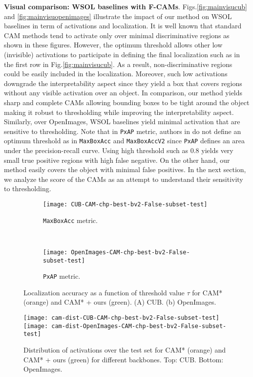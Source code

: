 \documentclass[twocolumn]{article}
\newcommand\maxboxacc{\texttt{MaxBoxAcc}\xspace}
\newcommand\newmaxboxacc{\texttt{MaxBoxAccV2}\xspace}
\newcommand\pxap{\texttt{PxAP}\xspace}
\theoremstyle{definition}
\begin{document}
\noindent \textbf{Visual comparison: WSOL baselines with F-CAMs}. Figs.\ref{fig:mainvisucub} and \ref{fig:mainvisuopenimages} illustrate the impact of our method on WSOL baselines in term of activations and localization. It is well known that standard CAM methods tend to activate only over minimal discriminative regions as shown in these figures. However, the optimum threshold allows other low (invisible) activations to participate in defining the final localization such as in the first row in Fig.\ref{fig:mainvisucub}.  As a result, non-discriminative regions could be easily included in the localization. Moreover, such low activations downgrade the interpretability aspect since they yield a box that covers regions without any visible activation over an object.
In comparison, our method yields sharp and complete CAMs allowing bounding boxes to be tight around the object making it robust to thresholding while improving the interpretability aspect.
Similarly, over OpenImages, WSOL baselines yield minimal activation that are sensitive to thresholding. Note that in \pxap metric, authors in \cite{choe2020evaluating} do not define an optimum threshold as in \maxboxacc and \newmaxboxacc since \pxap defines an area under the precision-recall curve. Using high threshold such as $0.8$ yields very small true positive regions with high false negative. On the other hand, our method easily covers the object with minimal false positives.
In the next section, we analyze the score of the CAMs as an attempt to understand their sensitivity to thresholding.
\begin{figure}
     \centering
     \begin{subfigure}[b]{0.45\textwidth}
         \centering
         \texttt{[image: CUB-CAM-chp-best-bv2-False-subset-test]}
          \caption{\maxboxacc metric.}
         \label{fig:cam-maxbo-tau}
     \end{subfigure}
     \\
     \vspace{.2cm}
     \begin{subfigure}[b]{0.45\textwidth}
         \centering
         \texttt{[image: OpenImages-CAM-chp-best-bv2-False-subset-test]}
          \caption{\pxap metric.}
         \label{fig:cam-pxap-tau}
     \end{subfigure}
        \caption{Localization accuracy as a function of threshold value ${\tau}$ for CAM* (orange) and  CAM* + ours (green). (A) CUB. (b) OpenImages.}
        \label{fig:cam-tau}
\end{figure}
\begin{figure}
     \centering
         \texttt{[image: cam-dist-CUB-CAM-chp-best-bv2-False-subset-test]}
            \\
         \texttt{[image: cam-dist-OpenImages-CAM-chp-best-bv2-False-subset-test]}
        \caption{Distribution of activations over the test set for CAM* (orange) and CAM* + ours (green) for different backbones. Top: CUB. Bottom: OpenImages.}
        \label{fig:cam-ac-distribution}
\end{figure}
\end{document}
